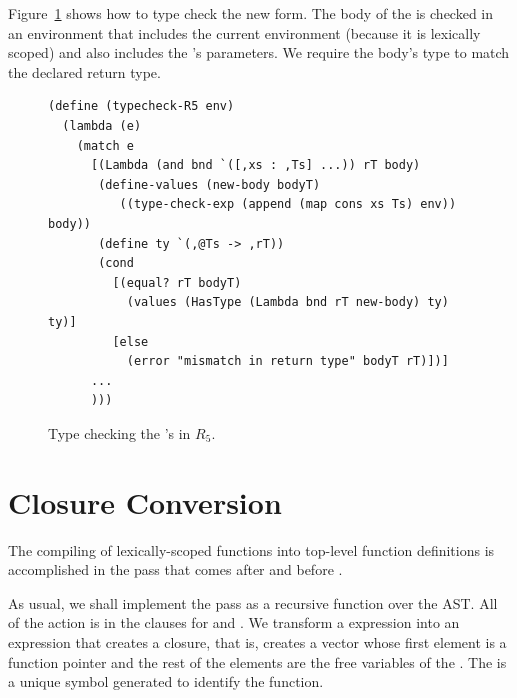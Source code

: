 \documentclass[11pt]{book}
\begin{document}
\label{sec:type-check-r5}

Figure~\ref{fig:typecheck-R5} shows how to type check the new
 form. The body of the  is checked in an
environment that includes the current environment (because it is
lexically scoped) and also includes the 's parameters.  We
require the body's type to match the declared return type.

\begin{figure}[tbp]
\begin{lstlisting}
(define (typecheck-R5 env)
  (lambda (e)
    (match e
      [(Lambda (and bnd `([,xs : ,Ts] ...)) rT body)
       (define-values (new-body bodyT) 
          ((type-check-exp (append (map cons xs Ts) env)) body))
       (define ty `(,@Ts -> ,rT))
       (cond
         [(equal? rT bodyT)
           (values (HasType (Lambda bnd rT new-body) ty) ty)]
         [else
           (error "mismatch in return type" bodyT rT)])]
      ...
      )))
\end{lstlisting}
\caption{Type checking the 's in $R_5$.}
\label{fig:typecheck-R5}
\end{figure}


\section{Closure Conversion}
\label{sec:closure-conversion}

The compiling of lexically-scoped functions into top-level function
definitions is accomplished in the pass 
that comes after  and before
. 

As usual, we shall implement the pass as a recursive function over the
AST. All of the action is in the clauses for  and
. We transform a  expression into an expression
that creates a closure, that is, creates a vector whose first element
is a function pointer and the rest of the elements are the free
variables of the .  The  is a unique symbol
generated to identify the function.
\end{document}

